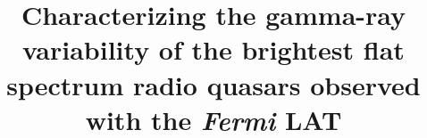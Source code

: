 \documentclass[twocolumn]{aastex62}
\begin{document}
\title{Characterizing the gamma-ray variability of the brightest flat spectrum radio quasars observed with the \emph{Fermi} LAT}


\end{document}
